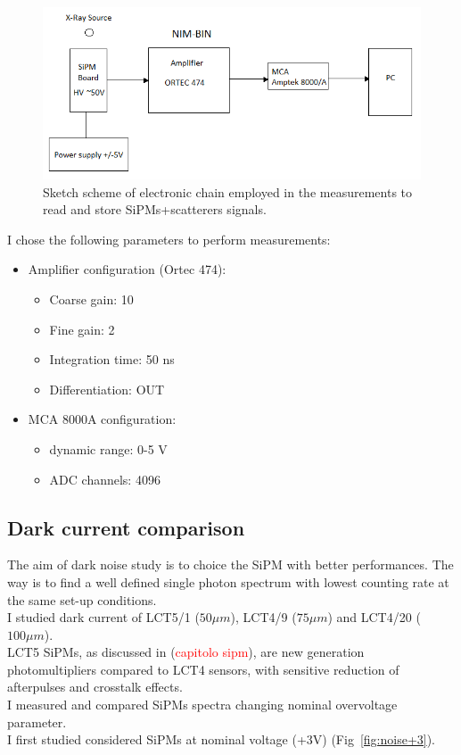 \documentclass[10pt,a4paper, openany]{book}
\begin{document}
\begin{figure}[!h]
\begin{center}
\includegraphics[scale=0.6]{imm/chain2.png}
\end{center}
\caption{Sketch scheme of electronic chain employed in the measurements to read and store SiPMs+scatterers signals.} 
\label{fig:chain2}
\end{figure}

I chose the following parameters to perform measurements:
\begin{itemize}
\item Amplifier configuration (Ortec 474):
\begin{itemize}
\item Coarse gain: 10
\item Fine gain: 2
\item Integration time: 50 ns
\item Differentiation: OUT
\end{itemize}
\item MCA 8000A configuration:
\begin{itemize}
\item dynamic range: 0-5 V
\item ADC channels: 4096
\end{itemize}
\end{itemize}

\subsection{Dark current comparison}

The aim of dark noise study is to choice the SiPM with better performances. The way is to find a well defined single photon spectrum with lowest counting rate at the same set-up conditions.\\
I studied dark current of LCT5/1 ($50\mu m$), LCT4/9 ($75\mu m$) and LCT4/20 ($100\mu m$).\\
LCT5 SiPMs, as discussed in (\textcolor{red}{capitolo sipm}), are new generation photomultipliers compared to LCT4 sensors, with sensitive reduction of afterpulses and crosstalk effects.\\
I measured and compared SiPMs spectra changing nominal overvoltage parameter.\\
I first studied considered SiPMs at nominal voltage (+3V) (Fig~\ref{fig:noise+3}).
\end{document}
